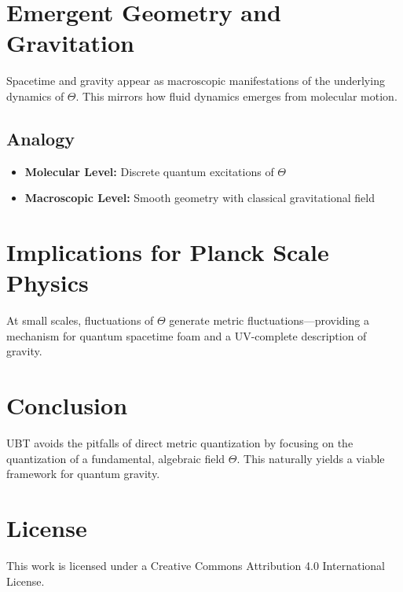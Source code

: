 \documentclass[12pt]{article}
\begin{document}
\section{Emergent Geometry and Gravitation}

Spacetime and gravity appear as macroscopic manifestations of the underlying dynamics of $\Theta$. This mirrors how fluid dynamics emerges from molecular motion.

\subsection{Analogy}

\begin{itemize}
  \item \textbf{Molecular Level:} Discrete quantum excitations of $\Theta$
  \item \textbf{Macroscopic Level:} Smooth geometry with classical gravitational field
\end{itemize}

\section{Implications for Planck Scale Physics}

At small scales, fluctuations of $\Theta$ generate metric fluctuations---providing a mechanism for quantum spacetime foam and a UV-complete description of gravity.

\section{Conclusion}

UBT avoids the pitfalls of direct metric quantization by focusing on the quantization of a fundamental, algebraic field $\Theta$. This naturally yields a viable framework for quantum gravity.

\section*{License}
This work is licensed under a Creative Commons Attribution 4.0 International License.
\end{document}

